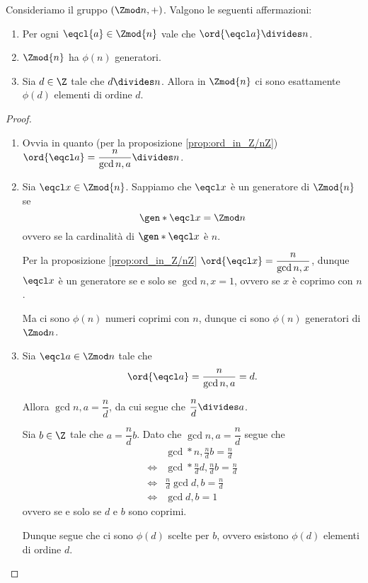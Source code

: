 \begin{corollary}
    \label{cor:cons_ord_in_Z/nZ}
    Consideriamo il gruppo $(\Zmod n, +)$. Valgono le seguenti affermazioni:
    \begin{enumerate}[label={(\roman*)}, ref={\theproposition: (\roman*)}]
        \item \label{cor:cons_ord_in_Z/nZ:ord_a_div_n} Per ogni $\eqcl{a} \in \Zmod{n}$ vale che $\ord{\eqcl a} \divides n$.
        \item \label{cor:cons_ord_in_Z/nZ:phi(n)_gen} $\Zmod{n}$ ha $\phi(n)$ generatori.
        \item \label{cor:cons_ord_in_Z/nZ:phi(d)_el} Sia $d \in \Z$ tale che $d \divides n$. Allora in $\Zmod{n}$ ci sono esattamente $\phi(d)$ elementi di ordine $d$.
    \end{enumerate}
\end{corollary}
\begin{proof}
    \begin{enumerate}[label={(\roman*)}]
        Dimostriamo separatamente le tre affermazioni.
        \item Ovvia in quanto (per la proposizione \ref{prop:ord_in_Z/nZ}) $\ord{\eqcl a} = \dfrac{n}{\gcd{n, a}} \divides n$.
        \item Sia $\eqcl x \in \Zmod{n}$. Sappiamo che $\eqcl x$ è un generatore di $\Zmod{n}$ se \[
            \gen*{\eqcl x} = \Zmod n    
        \] ovvero se la cardinalità di $\gen*{\eqcl x}$ è $n$.

        Per la proposizione \ref{prop:ord_in_Z/nZ} $\ord{\eqcl x} = \dfrac{n}{\gcd{n, x}}$, dunque $\eqcl x$ è un generatore se e solo se $\gcd{n, x} = 1$, ovvero se $x$ è coprimo con $n$.

        Ma ci sono $\phi(n)$ numeri coprimi con $n$, dunque ci sono $\phi(n)$ generatori di $\Zmod n$.
        \item Sia $\eqcl a \in \Zmod n$ tale che \[
            \ord{\eqcl a} = \frac{n}{\gcd{n, a}} = d.    
        \]

        Allora $\gcd{n, a} = \dfrac{n}{d}$, da cui segue che $\dfrac{n}{d} \divides a$.

        Sia $b \in \Z$ tale che $a = \dfrac{n}{d}b$. Dato che $\gcd{n, a} = \dfrac{n}{d}$ segue che \begin{align*}
            &\gcd*{n, \frac{n}{d}b} = \frac{n}{d}\\[3pt]
            \iff &\gcd*{\frac{n}{d}d, \frac{n}{d}b} = \frac{n}{d}\\[3pt]
            \iff &\frac{n}{d}\gcd{d, b} = \frac{n}{d}\\[3pt]
            \iff &\gcd{d, b} = 1
        \end{align*}
        ovvero se e solo se $d$ e $b$ sono coprimi.

        Dunque segue che ci sono $\phi(d)$ scelte per $b$, ovvero esistono $\phi(d)$ elementi di ordine $d$.
    \end{enumerate}
\end{proof}


